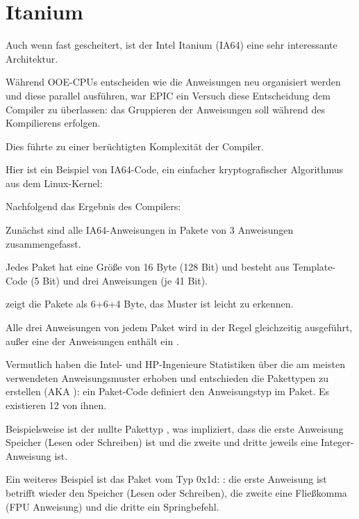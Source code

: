 \section{Itanium}
\label{itanium}

Auch wenn fast gescheitert, ist der Intel Itanium (\ac{IA64}) eine sehr interessante
Architektur.

Während \ac{OOE}-CPUs entscheiden wie die Anweisungen neu organisiert werden und
diese parallel ausführen, war \ac{EPIC} ein Versuch diese Entscheidung dem Compiler
zu überlassen: das Gruppieren der Anweisungen soll während des Kompilierens erfolgen.

Dies führte zu einer berüchtigten Komplexität der Compiler.

Hier ist ein Beispiel von \ac{IA64}-Code, ein einfacher kryptografischer Algorithmus
aus dem Linux-Kernel:



Nachfolgend das Ergebnis des Compilers:



Zunächst sind alle \ac{IA64}-Anweisungen in Pakete von 3 Anweisungen zusammengefasst.

Jedes Paket hat eine Größe von 16 Byte (128 Bit) und besteht aus Template-Code
(5 Bit) und drei Anweisungen (je 41 Bit).

\IDA zeigt die Pakete als 6+6+4 Byte, das Muster ist leicht zu erkennen.

Alle drei Anweisungen von jedem Paket wird in der Regel gleichzeitig ausgeführt,
außer eine der Anweisungen enthält ein .

Vermutlich haben die Intel- und HP-Ingenieure Statistiken über die am meisten verwendeten
Anweisungsmuster erhoben und entschieden die Pakettypen zu erstellen (\ac{AKA} ): 
ein Paket-Code definiert den Anweisungstyp im Paket.
Es existieren 12 von ihnen.

Beispielsweise ist der nullte Pakettyp , was impliziert, dass die erste
Anweisung Speicher (Lesen oder Schreiben) ist und die zweite und dritte jeweils
eine Integer-Anweisung ist.

Ein weiteres Beispiel ist das Paket vom Typ 0x1d: :
die erste Anweisung ist betrifft wieder den Speicher (Lesen oder Schreiben), die
zweite eine Fließkomma (\ac{FPU} Anweisung) und die dritte ein Springbefehl.


